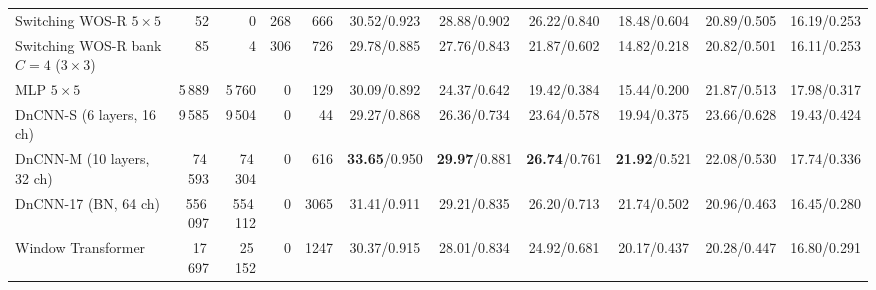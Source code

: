 \begin{table}[t]
{\begin{tabular}{lrrrr|cccc|cc}
Switching WOS-R $5{\times}5$ & 52 & 0 & 268 & 666 & 30.52/0.923 & 28.88/0.902 & 26.22/0.840 & 18.48/0.604 & 20.89/0.505 & 16.19/0.253\\
Switching WOS-R bank $C{=}4$ ($3{\times}3$) & 85 & 4 & 306 & 726 & 29.78/0.885 & 27.76/0.843 & 21.87/0.602 & 14.82/0.218 & 20.82/0.501 & 16.11/0.253\\
MLP $5{\times}5$ & 5\,889 & 5\,760 & 0 & 129 & 30.09/0.892 & 24.37/0.642 & 19.42/0.384 & 15.44/0.200 & 21.87/0.513 & 17.98/0.317\\
DnCNN-S (6 layers, 16 ch) & 9\,585 & 9\,504 & 0 & 44 & 29.27/0.868 & 26.36/0.734 & 23.64/0.578 & 19.94/0.375 & 23.66/0.628 & 19.43/0.424\\
DnCNN-M (10 layers, 32 ch) & 74\,593 & 74\,304 & 0 & 616 & \textbf{33.65}/0.950 & \textbf{29.97}/0.881 & \textbf{26.74}/0.761 & \textbf{21.92}/0.521 & 22.08/0.530 & 17.74/0.336\\
DnCNN-17 (BN, 64 ch) & 556\,097 & 554\,112 & 0 & 3065 & 31.41/0.911 & 29.21/0.835 & 26.20/0.713 & 21.74/0.502 & 20.96/0.463 & 16.45/0.280\\
Window Transformer & 17\,697 & 25\,152 & 0 & 1247 & 30.37/0.915 & 28.01/0.834 & 24.92/0.681 & 20.17/0.437 & 20.28/0.447 & 16.80/0.291\\
\bottomrule\end{tabular}}\end{table}